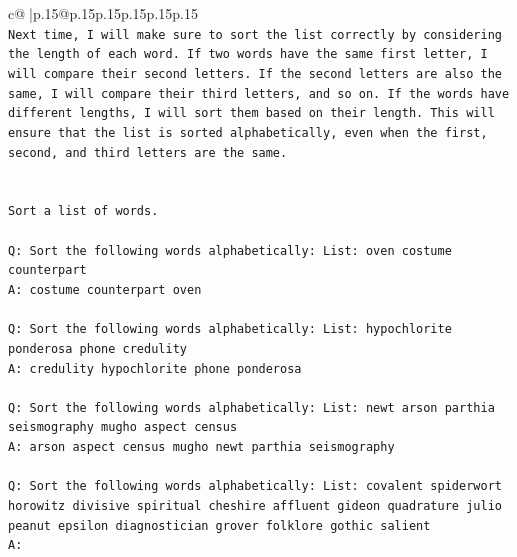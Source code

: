 \documentclass{article}
\begin{document}
{\begin{supertabular}{c@{$\;$}|p{.15\linewidth}@{}p{.15\linewidth}p{.15\linewidth}p{.15\linewidth}p{.15\linewidth}p{.15\linewidth}}
{{{\\ 
\texttt{Next time, I will make sure to sort the list correctly by considering the length of each word. If two words have the same first letter, I will compare their second letters. If the second letters are also the same, I will compare their third letters, and so on. If the words have different lengths, I will sort them based on their length. This will ensure that the list is sorted alphabetically, even when the first, second, and third letters are the same.} \\
\\ 
\\ 
\texttt{Sort a list of words.} \\
\\ 
\texttt{Q: Sort the following words alphabetically: List: oven costume counterpart} \\
\texttt{A: costume counterpart oven} \\
\\ 
\texttt{Q: Sort the following words alphabetically: List: hypochlorite ponderosa phone credulity} \\
\texttt{A: credulity hypochlorite phone ponderosa} \\
\\ 
\texttt{Q: Sort the following words alphabetically: List: newt arson parthia seismography mugho aspect census} \\
\texttt{A: arson aspect census mugho newt parthia seismography} \\
\\ 
\texttt{Q: Sort the following words alphabetically: List: covalent spiderwort horowitz divisive spiritual cheshire affluent gideon quadrature julio peanut epsilon diagnostician grover folklore gothic salient} \\
\texttt{A:} \\
            }
        }
    }
     \\ \\


\end{supertabular}}
\end{document}
